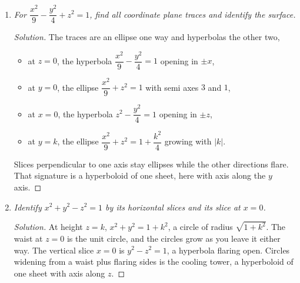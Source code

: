 \documentclass[12pt]{article}
\newenvironment{solution}
  {\renewcommand\qedsymbol{$\blacksquare$}\begin{proof}[Solution]}
  {\end{proof}}
\begin{document}
\begin{enumerate}
\begin{enumerate}
\begin{solution}
    \begin{center}
    \end{center}
    \end{solution}

    \item \textit{For $\dfrac{x^2}{9}-\dfrac{y^2}{4}+z^2=1$, find all coordinate plane traces and identify the surface.}

    \begin{solution}
    The traces are an ellipse one way and hyperbolas the other two,
    \begin{itemize}\itemsep1pt
      \item at $z=0$, the hyperbola $\dfrac{x^2}{9}-\dfrac{y^2}{4}=1$ opening in $\pm x$,
      \item at $y=0$, the ellipse $\dfrac{x^2}{9}+z^2=1$ with semi axes $3$ and $1$,
      \item at $x=0$, the hyperbola $z^2-\dfrac{y^2}{4}=1$ opening in $\pm z$,
      \item at $y=k$, the ellipse $\dfrac{x^2}{9}+z^2=1+\dfrac{k^2}{4}$ growing with $|k|$.
    \end{itemize}
    Slices perpendicular to one axis stay ellipses while the other directions flare. That signature is a hyperboloid of one sheet, here with axis along the $y$ axis.
    \end{solution}

    \item \textit{Identify $x^2+y^2-z^2=1$ by its horizontal slices and its slice at $x=0$.}

    \begin{solution}
    At height $z=k$, $x^2+y^2=1+k^2$, a circle of radius $\sqrt{1+k^2}$. The waist at $z=0$ is the unit circle, and the circles grow as you leave it either way. The vertical slice $x=0$ is $y^2-z^2=1$, a hyperbola flaring open. Circles widening from a waist plus flaring sides is the cooling tower, a hyperboloid of one sheet with axis along $z$.
    \end{solution}


\end{enumerate}
\end{enumerate}
\end{document}
